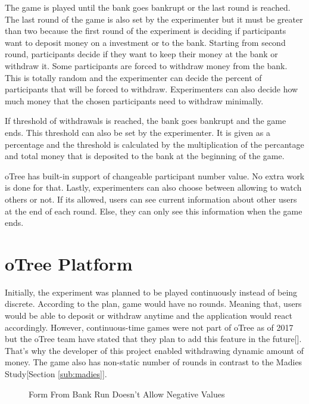 The game is played until the bank goes bankrupt or the last round is reached. The last round of the game is also set by the experimenter but it must be greater than two because the first round of the experiment is deciding if participants want to deposit money on a investment or to the bank. Starting from second round, participants decide if they want to keep their money at the bank or  withdraw it. Some participants are forced to withdraw money from the bank. This is totally random and the experimenter can decide the percent of participants that will be forced to withdraw. Experimenters can also decide how much money that the chosen participants need to withdraw minimally. 

If threshold of withdrawals is reached, the bank goes bankrupt and the game ends. This threshold can also be set by the experimenter. It is given as a percentage and the threshold is calculated by the multiplication of the percantage and total money that is deposited to the bank at the beginning of the game. 

oTree has built-in support of changeable participant number value. No extra work is done for that. Lastly, experimenters can also choose between allowing to watch others or not. If its allowed, users can see current information about other users at the end of each round. Else, they can only see this information when the game ends.

\section{oTree Platform}

Initially, the experiment was planned to be played continuously instead of being discrete. According to the plan, game would have no rounds. Meaning that, users would be able to deposit or withdraw anytime and the application would react accordingly. However, continuous-time games were not part of oTree as of 2017 but the oTree team have stated that they plan to add this feature in the future[\cite{oTreeSlides2007}]. That's why the developer of this project enabled withdrawing dynamic amount of money. The game also has non-static number of rounds in contrast to the Madies Study[Section \ref{sub:madies}].

\begin{figure}[h]
	\centerline{}
	\caption{Form From Bank Run Doesn't Allow Negative Values }
	\label{tab:picture12}
	
\end{figure}

